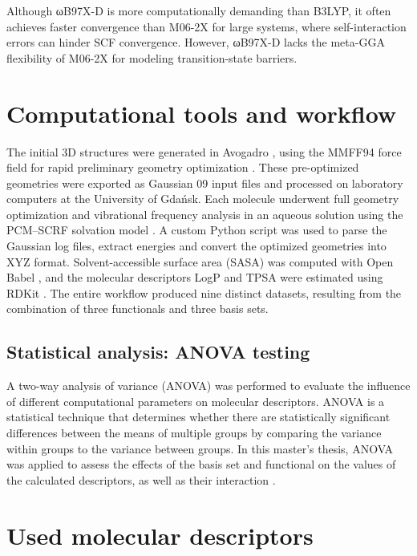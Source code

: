 Although ωB97X-D is more computationally demanding than B3LYP, it often achieves faster convergence than M06-2X for large systems, where self-interaction errors can hinder SCF convergence. However, ωB97X-D lacks the meta-GGA flexibility of M06-2X for modeling transition-state barriers.

\section{Computational tools and workflow}

 The initial 3D structures were generated in Avogadro \cite{avogadro2012}, using the MMFF94 force field for rapid preliminary geometry optimization \cite{avogadro_mmff94}. These pre-optimized geometries were exported as Gaussian 09 input files and processed on laboratory computers at the University of Gdańsk. Each molecule underwent full geometry optimization and vibrational frequency analysis in an aqueous solution using the PCM–SCRF solvation model \cite{gaussian_scrf}. A custom Python script was used to parse the Gaussian log files, extract energies and convert the optimized geometries into XYZ format. Solvent-accessible surface area (SASA) was computed with Open Babel \cite{oboyle2011}, and the molecular descriptors LogP and TPSA were estimated using RDKit \cite{rdkit}. The entire workflow produced nine distinct datasets, resulting from the combination of three functionals and three basis sets.

\subsection{Statistical analysis: ANOVA testing}

A two-way analysis of variance (ANOVA) was performed to evaluate the influence of different computational parameters on molecular descriptors. ANOVA is a statistical technique that determines whether there are statistically significant differences between the means of multiple groups by comparing the variance within groups to the variance between groups. In this master’s thesis, ANOVA was applied to assess the effects of the basis set and functional on the values of the calculated descriptors, as well as their interaction \cite{Orosz2022, Kovacs2021}.

\section{Used molecular descriptors}

